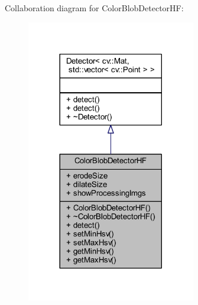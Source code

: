 Collaboration diagram for Color\+Blob\+Detector\+H\+F\+:
\nopagebreak
\begin{figure}[H]
\begin{center}
\leavevmode
\includegraphics[width=209pt]{class_viscv_1_1_color_blob_detector_h_f__coll__graph}
\end{center}
\end{figure}
